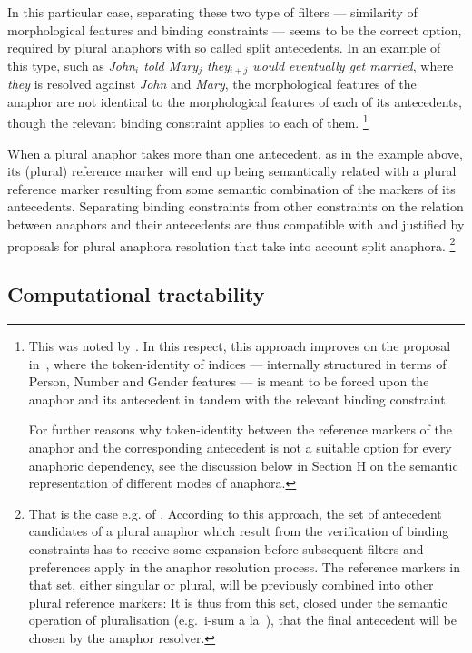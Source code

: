 \documentclass[output=paper
,modfonts
,nonflat]{langsci/langscibook}
\begin{document}
In this particular case, separating these two type of filters --- similarity of
morphological features and binding constraints --- seems to be the correct
option, required by plural anaphors with so called split antecedents. In an example 
of this type, such as {\it John$_{i}$ told Mary$_{j}$ they$_{i+j}$ would eventually get
married}, where {\it they} is resolved against {\it John} and {\it Mary}, the
morphological features of the anaphor are not identical to the morphological
features of each of its antecedents, though the relevant binding constraint
applies to each of them.%
%
\footnote{This was noted by \citep{higg:split83}. In this respect, this approach improves on the proposal in~\citep{polsag:hpsg94},
where the token-identity of indices --- internally structured in
terms of Person, Number and Gender features --- is meant to be
forced upon the anaphor and its antecedent in tandem with the relevant binding
constraint. 

For further reasons why token-identity between
the reference markers of the anaphor and the corresponding antecedent
is not a suitable option for every anaphoric dependency,
see the discussion below in Section H
on the semantic representation of different modes of anaphora.}
% 


When a plural anaphor takes more than one antecedent, as in the example above, 
its (plural) reference marker will end up being semantically related with a
plural reference marker resulting from some semantic combination
of the markers of its antecedents. Separating binding constraints from
other constraints on the relation between anaphors and their antecedents
are thus compatible with and justified by proposals for plural anaphora 
resolution that take into account split anaphora.%
%
\footnote{
That is the case e.g. of \citep{eschen:plural89}. According to this approach, the set of antecedent candidates of 
a plural anaphor which result from the verification of
binding constraints has to receive some expansion before subsequent 
filters and preferences apply in the anaphor resolution process. The reference
markers in that set, either singular or plural, will be 
previously combined into other plural reference markers: It is thus
from this set, closed under the semantic operation of 
pluralisation (e.g.\ i-sum a la~\citep{link:isums83}),
that the final antecedent will be chosen by the anaphor resolver.
}

\subsection{Computational tractability} 
\end{document}
